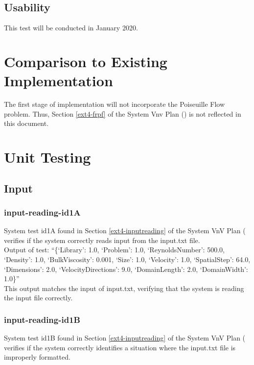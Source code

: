 \documentclass[12pt, titlepage]{article}
\begin{document}
\subsection{Usability}

This test will be conducted in January 2020.
	
\section{Comparison to Existing Implementation}	
The first stage of implementation will not incorporate the Poiseuille Flow problem. Thus, Section \ref{ext4-frpf} of the System Vnv Plan (\citet{LBM_SVNV_PM}) is not reflected in this document.

\section{Unit Testing}
\label{unittesting}

\subsection{Input}
\subsubsection{input-reading-id1A}

System test id1A found in Section \ref{ext4-inputreading} of the System VnV Plan (\citet{LBM_SVNV_PM} verifies if the system correctly reads input from the input.txt file.\\

\noindent Output of test: ``\{`Library': 1.0, `Problem': 1.0, `ReynoldsNumber': 500.0, `Density': 1.0, `BulkViscosity': 0.001, `Size': 1.0, `Velocity': 1.0, `SpatialStep': 64.0, `Dimensions': 2.0, `VelocityDirections': 9.0, `DomainLength': 2.0, `DomainWidth': 1.0\}''\\

\noindent This output matches the input of input.txt, verifying that the system is reading the input file correctly.

\subsubsection{input-reading-id1B}

System test id1B found in Section \ref{ext4-inputreading} of the System VnV Plan (\citet{LBM_SVNV_PM} verifies if the system correctly identifies a situation where the input.txt file is improperly formatted.\\
\end{document}
